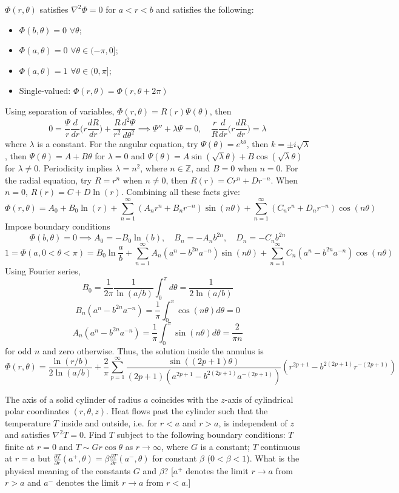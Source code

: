\documentclass[a4paper]{article}
\begin{document}
\begin{ans}
$\Phi(r,\theta)$ satisfies $\nabla^2\Phi=0$ for $a<r<b$ and satisfies the following:
\begin{itemize}
    \item $\Phi(b,\theta)=0$ $\forall\theta$;
    \item $\Phi(a,\theta)=0$ $\forall\theta\in(-\pi,0]$;
    \item $\Phi(a,\theta)=1$ $\forall\theta\in(0,\pi]$;
    \item Single-valued:  $\Phi(r,\theta)=\Phi(r,\theta+2\pi)$
\end{itemize}
Using separation of variables, $\Phi(r,\theta)=R(r)\Psi(\theta)$, then
$$0=\frac{\Psi}{r}\frac{d}{dr}\bigg(r\frac{dR}{dr}\bigg)+\frac{R}{r^2}\frac{d^2\Psi}{d\theta^2}\implies \Psi''+\lambda\Psi=0,\quad\frac{r}{R}\frac{d}{dr}\bigg(r\frac{dR}{dr}\bigg)=\lambda$$
where $\lambda$ is a constant. For the angular equation, try $\Psi(\theta)=e^{k\theta}$, then $k=\pm i\sqrt{\lambda}$, then $\Psi(\theta)=A+B\theta$ for $\lambda=0$ and $\Psi(\theta)=A\sin(\sqrt{\lambda}\theta)+B\cos(\sqrt{\lambda}\theta)$ for $\lambda\neq 0$. Periodicity implies $\lambda=n^2$, where $n\in\mathbb{Z}$, and $B=0$ when $n=0$. For the radial equation, try $R=r^n$ when $n\neq 0$, then $R(r)=Cr^n+Dr^{-n}$. When $n=0$, $R(r)=C+D\ln(r)$. Combining all these facts give:
$$\Phi(r,\theta)=A_0+B_0\ln(r)+\sum_{n=1}^\infty(A_nr^n+B_nr^{-n})\sin(n\theta)+\sum_{n=1}^\infty(C_nr^n+D_nr^{-n})\cos(n\theta)$$
Impose boundary conditions
$$\Phi(b,\theta)=0\implies A_0=-B_0\ln(b),\quad B_n=-A_nb^{2n},\quad D_n=-C_nb^{2n}$$
$$1=\Phi(a,0<\theta<\pi)=B_0\ln\frac{a}{b}+\sum_{n=1}^\infty A_n(a^n-b^{2n}a^{-n})\sin(n\theta)+\sum_{n=1}^\infty C_n(a^n-b^{2n}a^{-n})\cos(n\theta)$$
Using Fourier series,
$$B_0=\frac{1}{2\pi}\frac{1}{\ln(a/b)}\int_0^\pi d\theta=\frac{1}{2\ln(a/b)}$$
$$B_n(a^n-b^{2n}a^{-n})=\frac{1}{\pi}\int_0^\pi\cos(n\theta)d\theta=0$$
$$A_n(a^n-b^{2n}a^{-n})=\frac{1}{\pi}\int_0^\pi\sin(n\theta)d\theta=\frac{2}{\pi n}$$
for odd $n$ and zero otherwise. Thus, the solution inside the annulus is
$$\Phi(r,\theta)=\frac{\ln(r/b)}{2\ln(a/b)}+\frac{2}{\pi}\sum_{p=1}^\infty\frac{\sin((2p+1)\theta)}{(2p+1)(a^{2p+1}-b^{2(2p+1)}a^{-(2p+1)})}(r^{2p+1}-b^{2(2p+1)}r^{-(2p+1)})$$
\end{ans}
\newpage
\begin{qns}
The axis of a solid cylinder of radius $a$ coincides with the $z$-axis of cylindrical polar coordinates $(r,\theta,z)$. Heat flows past the cylinder such that the temperature $T$ inside and outside, i.e. for $r < a$ and $r > a$, is independent of $z$ and satisfies $\nabla^2T=0$. Find $T$ subject to the following boundary conditions: $T$ finite at $r = 0$ and $T\sim Gr\cos\theta$ as $r\rightarrow\infty$, where $G$ is a constant; $T$ continuous at $r = a$ but $\frac{\partial T}{\partial r}(a^+,\theta)=\beta\frac{\partial T}{\partial r}(a^-,\theta)$ for constant $\beta$ ($0<\beta<1$). What is the physical meaning of the constants $G$ and $\beta$? [$a^+$ denotes the limit $r\rightarrow a$ from $r > a$ and $a^-$ denotes the limit $r\rightarrow a$ from $r<a$.]
\end{qns}
\end{document}
